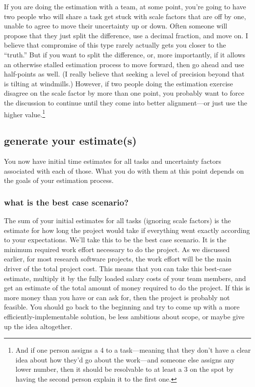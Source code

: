 \documentclass[12pt,oneside]{book}
\begin{document}
If you are doing the estimation with a team, at some point, you're going to have two people who will share a task get stuck with scale factors that are off by one, unable to agree to move their uncertainty up or down. Often someone will propose that they just split the difference, use a decimal fraction, and move on. I believe that compromise of this type rarely actually gets you closer to the ``truth.'' But if you want to split the difference, or, more importantly, if it allows an otherwise stalled estimation process to move forward, then go ahead and use half-points as well. (I really believe that seeking a level of precision beyond that is tilting at windmills.) However, if two people doing the estimation exercise disagree on the scale factor by more than one point, you probably want to force the discussion to continue until they come into better alignment---or just use the higher value.\footnote{
And if one person assigns a 4 to a task---meaning that they don't have a clear idea about how they'd go about the work---and someone else assigns any lower number, then it should be resolvable to at least a 3 on the spot by having the second person explain it to the first one.}

\subsection*{generate your estimate(s)}
\label{scrivauto:38}

You now have initial time estimates for all tasks and uncertainty factors associated with each of those. What you do with them at this point depends on the goals of your estimation process.

\subsubsection*{what is the best case scenario?}
\label{scrivauto:39}

The sum of your initial estimates for all tasks (ignoring scale factors) is the estimate for how long the project would take if everything went exactly according to your expectations. We'll take this to be the best case scenario. It is the minimum required work effort necessary to do the project. As we discussed earlier, for most research software projects, the work effort will be the main driver of the total project cost. This means that you can take this best-case estimate, multiply it by the fully loaded salary costs of your team members, and get an estimate of the total amount of money required to do the project. If this is more money than you have or can ask for, then the project is probably not feasible. You should go back to the beginning and try to come up with a more efficiently-implementable solution, be less ambitious about scope, or maybe give up the idea altogether.
\end{document}

